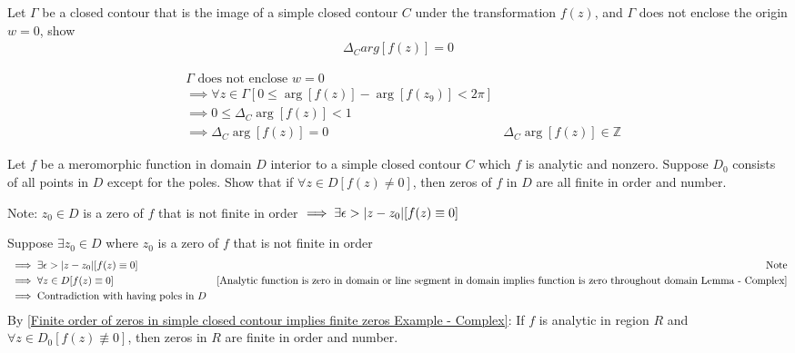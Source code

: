 \documentclass[12pt, english]{book}
\makeatletter
\renewenvironment{proof}[1][\proofname]{\par
	\pushQED{\qed}%
	\normalfont \topsep6\p@\@plus6\p@\relax
	\list{}{%
		\settowidth{\leftmargin}{\itshape\proofname:\hskip\labelsep}%
		\setlength{\labelwidth}{0pt}%
		\setlength{\itemindent}{-\leftmargin}%
	}%
	\item[\hskip\labelsep\itshape#1\@addpunct{:}]\ignorespaces
	}{ \popQED\endlist\@endpefalse}
\makeatother
\begin{document}
	\begin{example}
		\label{Closed contour does not enclose origin implies winding number is zero Example - Complex}
		Let \(\Gamma\) be a closed contour that is the image of a simple closed contour \(C\) under the transformation \(f(z)\), and \(\Gamma\) does not enclose the origin \(w = 0\), show 
		\begin{align*}
			\Delta_{C} arg[f(z)] = 0
		\end{align*}
		\begin{proof}
			{\color{Grey}
			\begin{align*}
				&\Gamma \text{ does not enclose } w=0 \\
				&\implies \forall z \in \Gamma [0 \leq \arg[f(z)] - \arg[f(z_9)] < 2\pi] \\
				&\implies 0 \leq \Delta_{C} \arg[f(z)] < 1 \\
				&\implies \Delta_{C} \arg[f(z)] = 0
					&\Delta_{C} \arg[f(z)] \in \mathbb{Z}
			\end{align*}
			}
		\end{proof}
	\end{example}
	
	\begin{example}
		\label{Function not identically zero in domain implies zeros of function finite in order and number Example - Complex}
		Let \(f\) be a meromorphic function in domain \(D\) interior to a simple closed contour \(C\) which \(f\) is analytic and nonzero. Suppose \(D_0\) consists of all points in \(D\) except for the poles. Show that if \(\forall z \in D[f(z) \neq 0]\), then zeros of \(f\) in \(D\) are all finite in order and number.
		
		Note: \(z_0 \in D\) is a zero of \(f\) that is not finite in order \(\implies \exists \epsilon > \abs{z-z_0} [f(z) \equiv 0]\)
		\begin{proof}
			{\color{Grey}
			Suppose \(\exists z_0 \in D\) where \(z_0\) is a zero of \(f\) that is not finite in order
			\begin{align*}
				&\implies \exists \epsilon > \abs{z-z_0} [f(z) \equiv 0]
					&\text{Note} \\
				&\implies \forall z \in D [f(z) \equiv 0] 
					&\text{\Cref{Analytic function is zero in domain or line segment in domain implies function is zero throughout domain Lemma - Complex}} \\
				&\implies \text{Contradiction with having poles in } D
			\end{align*}
			By \cref{Finite order of zeros in simple closed contour implies finite zeros Example - Complex}:
			If \(f\) is analytic in region \(R\) and \(\forall z \in D_0 [f(z) \nequiv 0]\), then zeros in \(R\) are finite in order and number.
			}
		\end{proof}
	\end{example}
	
\end{document}
